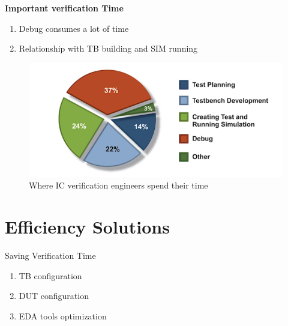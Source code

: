 \documentclass{beamer}
\begin{document}
\begin{frame}

  \textbf{Important verification Time}
  \begin{enumerate}
  \item Debug consumes a lot of time
  \item Relationship with TB building and SIM running
  \end{enumerate}
  \begin{figure}
    \centering
    \includegraphics[width=0.9\linewidth]{wilson5}
    \caption{Where IC verification engineers spend their time}
  \end{figure}

\end{frame}

\section{Efficiency Solutions}

\begin{frame}
  \begin{block}{Saving Verification Time}
    \begin{enumerate}
    \item TB configuration
    \item DUT configuration
    \item EDA tools optimization
    \end{enumerate}
  \end{block}
\end{frame}
\end{document}
